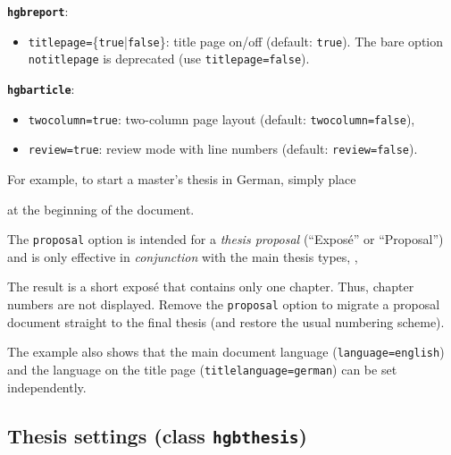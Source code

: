 \documentclass[language=english]{hgbarticle}
\begin{document}
\noindent\textbf{\texttt{hgbreport}}:
	\begin{itemize}
		\item \texttt{titlepage=}\{\texttt{true}|\texttt{false}\}:
			title page on/off (default: \texttt{true}).
			The bare option \texttt{notitlepage} is deprecated (use \texttt{titlepage=false}).
	\end{itemize}

\noindent\textbf{\texttt{hgbarticle}}:
	\begin{itemize}
		\item \texttt{twocolumn=true}: two-column page layout (default: \texttt{twocolumn=false}),
		\item \texttt{review=true}: review mode with line numbers (default: \texttt{review=false}).
	\end{itemize}

\noindent
For example, to start a master's thesis in German, simply place
%
%
at the beginning of the document.

The \texttt{proposal} option is intended for a \emph{thesis proposal} (``Exposé'' or ``Proposal'') and is
only effective in \emph{conjunction} with the main thesis types, \eg,
%
%
The result is a short exposé that contains only one chapter. Thus,
chapter numbers are not displayed. Remove the \texttt{proposal} option to
migrate a proposal document straight to the final thesis (and restore the usual
numbering scheme).

The example also shows that the main document language (\texttt{language=english}) and the
language on the title page (\texttt{titlelanguage=german}) can be set independently.

\subsection{Thesis settings (class \texttt{hgbthesis})}
\end{document}
